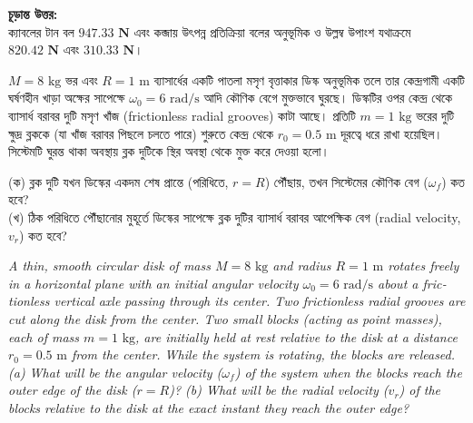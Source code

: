 \documentclass[12pt, a4paper]{article}
\begin{document}
\begin{tcolorbox}[solutionbox={সমাধান (Solution)}]
\vspace{1em}
\begin{tcolorbox}[answerbox]
\textbf{চূড়ান্ত উত্তর:} \\
ক্যাবলের টান বল $\mathbf{947.33\text{ N}}$ এবং কব্জায় উৎপন্ন প্রতিক্রিয়া বলের অনুভূমিক ও উল্লম্ব উপাংশ যথাক্রমে $\mathbf{820.42\text{ N}}$ এবং $\mathbf{310.33\text{ N}}$।
\end{tcolorbox}
\end{tcolorbox}

\begin{tcolorbox}[questionbox={প্রশ্ন (Question) 7}]
\noindent
$M = 8\text{ kg}$ ভর এবং $R = 1\text{ m}$ ব্যাসার্ধের একটি পাতলা মসৃণ বৃত্তাকার ডিস্ক অনুভূমিক তলে তার কেন্দ্রগামী একটি ঘর্ষণহীন খাড়া অক্ষের সাপেক্ষে $\omega_0 = 6\text{ rad/s}$ আদি কৌণিক বেগে মুক্তভাবে ঘুরছে। ডিস্কটির ওপর কেন্দ্র থেকে ব্যাসার্ধ বরাবর দুটি মসৃণ খাঁজ (frictionless radial grooves) কাটা আছে। প্রতিটি $m = 1\text{ kg}$ ভরের দুটি ক্ষুদ্র ব্লককে (যা খাঁজ বরাবর পিছলে চলতে পারে) শুরুতে কেন্দ্র থেকে $r_0 = 0.5\text{ m}$ দূরত্বে ধরে রাখা হয়েছিল। সিস্টেমটি ঘুরন্ত থাকা অবস্থায় ব্লক দুটিকে স্থির অবস্থা থেকে মুক্ত করে দেওয়া হলো। 

\vspace{0.3em}
\noindent
(ক) ব্লক দুটি যখন ডিস্কের একদম শেষ প্রান্তে (পরিধিতে, $r = R$) পৌঁছায়, তখন সিস্টেমের কৌণিক বেগ ($\omega_f$) কত হবে? \\
(খ) ঠিক পরিধিতে পৌঁছানোর মুহূর্তে ডিস্কের সাপেক্ষে ব্লক দুটির ব্যাসার্ধ বরাবর আপেক্ষিক বেগ (radial velocity, $v_r$) কত হবে?

\vspace{0.8em}
\begin{english}
\noindent\textit{\color{darkgray}
A thin, smooth circular disk of mass $M = 8\text{ kg}$ and radius $R = 1\text{ m}$ rotates freely in a horizontal plane with an initial angular velocity $\omega_0 = 6\text{ rad/s}$ about a frictionless vertical axle passing through its center. Two frictionless radial grooves are cut along the disk from the center. Two small blocks (acting as point masses), each of mass $m = 1\text{ kg}$, are initially held at rest relative to the disk at a distance $r_0 = 0.5\text{ m}$ from the center. While the system is rotating, the blocks are released. (a) What will be the angular velocity ($\omega_f$) of the system when the blocks reach the outer edge of the disk ($r = R$)? (b) What will be the radial velocity ($v_r$) of the blocks relative to the disk at the exact instant they reach the outer edge?
}
\end{english}
\end{tcolorbox}
\end{document}

